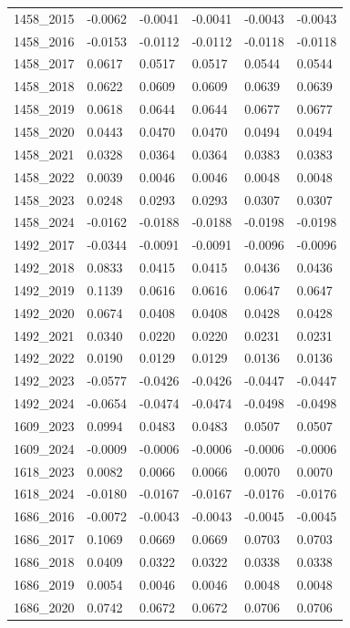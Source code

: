 \begin{table}[htbp]
\begin{tabular}{llllll}
1458_2015 & -0.0062 & -0.0041 & -0.0041 & -0.0043 & -0.0043 \\
1458_2016 & -0.0153 & -0.0112 & -0.0112 & -0.0118 & -0.0118 \\
1458_2017 & 0.0617 & 0.0517 & 0.0517 & 0.0544 & 0.0544 \\
1458_2018 & 0.0622 & 0.0609 & 0.0609 & 0.0639 & 0.0639 \\
1458_2019 & 0.0618 & 0.0644 & 0.0644 & 0.0677 & 0.0677 \\
1458_2020 & 0.0443 & 0.0470 & 0.0470 & 0.0494 & 0.0494 \\
1458_2021 & 0.0328 & 0.0364 & 0.0364 & 0.0383 & 0.0383 \\
1458_2022 & 0.0039 & 0.0046 & 0.0046 & 0.0048 & 0.0048 \\
1458_2023 & 0.0248 & 0.0293 & 0.0293 & 0.0307 & 0.0307 \\
1458_2024 & -0.0162 & -0.0188 & -0.0188 & -0.0198 & -0.0198 \\
1492_2017 & -0.0344 & -0.0091 & -0.0091 & -0.0096 & -0.0096 \\
1492_2018 & 0.0833 & 0.0415 & 0.0415 & 0.0436 & 0.0436 \\
1492_2019 & 0.1139 & 0.0616 & 0.0616 & 0.0647 & 0.0647 \\
1492_2020 & 0.0674 & 0.0408 & 0.0408 & 0.0428 & 0.0428 \\
1492_2021 & 0.0340 & 0.0220 & 0.0220 & 0.0231 & 0.0231 \\
1492_2022 & 0.0190 & 0.0129 & 0.0129 & 0.0136 & 0.0136 \\
1492_2023 & -0.0577 & -0.0426 & -0.0426 & -0.0447 & -0.0447 \\
1492_2024 & -0.0654 & -0.0474 & -0.0474 & -0.0498 & -0.0498 \\
1609_2023 & 0.0994 & 0.0483 & 0.0483 & 0.0507 & 0.0507 \\
1609_2024 & -0.0009 & -0.0006 & -0.0006 & -0.0006 & -0.0006 \\
1618_2023 & 0.0082 & 0.0066 & 0.0066 & 0.0070 & 0.0070 \\
1618_2024 & -0.0180 & -0.0167 & -0.0167 & -0.0176 & -0.0176 \\
1686_2016 & -0.0072 & -0.0043 & -0.0043 & -0.0045 & -0.0045 \\
1686_2017 & 0.1069 & 0.0669 & 0.0669 & 0.0703 & 0.0703 \\
1686_2018 & 0.0409 & 0.0322 & 0.0322 & 0.0338 & 0.0338 \\
1686_2019 & 0.0054 & 0.0046 & 0.0046 & 0.0048 & 0.0048 \\
1686_2020 & 0.0742 & 0.0672 & 0.0672 & 0.0706 & 0.0706 \\

\end{tabular}
\end{table}
